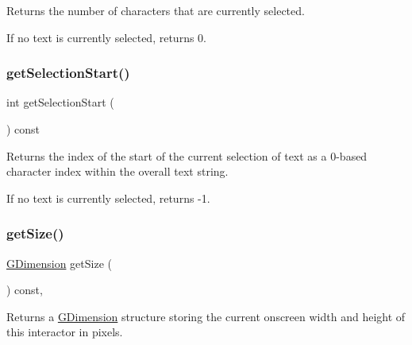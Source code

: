 Returns the number of characters that are currently selected. 

If no text is currently selected, returns 0. \mbox{\label{classsgl_1_1GTextArea_aad7c986a677c1b9cf445cd7cfb6a8975}} 
\subsubsection{\texorpdfstring{get\+Selection\+Start()}{getSelectionStart()}}
{\footnotesize\ttfamily int get\+Selection\+Start (\begin{DoxyParamCaption}{ }\end{DoxyParamCaption}) const\hspace{0.3cm}{\ttfamily [virtual]}}



Returns the index of the start of the current selection of text as a 0-\/based character index within the overall text string. 

If no text is currently selected, returns -\/1. \mbox{\label{classsgl_1_1GInteractor_a7b4eec96a2bdc6420695d5796a78eea9}} 
\subsubsection{\texorpdfstring{get\+Size()}{getSize()}}
{\footnotesize\ttfamily \mbox{\hyperlink{structsgl_1_1GDimension}{G\+Dimension}} get\+Size (\begin{DoxyParamCaption}{ }\end{DoxyParamCaption}) const\hspace{0.3cm}{\ttfamily [virtual]}, {\ttfamily [inherited]}}



Returns a \mbox{\hyperlink{structsgl_1_1GDimension}{G\+Dimension}} structure storing the current onscreen width and height of this interactor in pixels. 

\mbox{\label{classsgl_1_1GTextArea_aff553c50924b836c29f146ed34a7c6ec}} 
